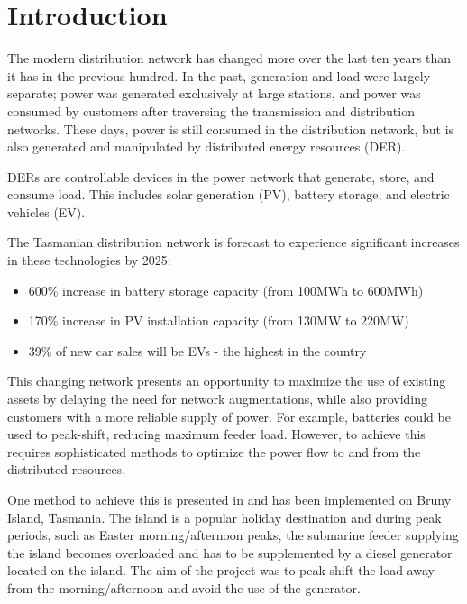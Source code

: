 \documentclass[conference]{IEEEtran}
\begin{document}
\section{Introduction}
The modern distribution network has changed more over the last ten years than it has in the previous hundred.
In the past, generation and load were largely separate; power was generated exclusively at large stations, and power was consumed by customers after traversing the transmission and distribution networks. 
These days, power is still consumed in the distribution network, but is also generated and manipulated by distributed energy resources (DER). 
\par
DERs are controllable devices in the power network that generate, store, and consume load. 
This includes solar generation (PV), battery storage, and electric vehicles (EV). 
\par
The Tasmanian distribution network is forecast to experience significant increases in these technologies by 2025: \\
\begin{itemize}
	\item 600\% increase in battery storage capacity (from 100MWh to 600MWh) \cite{Jacobs2017}
	\item 170\% increase in PV installation capacity (from 130MW to 220MW) \cite{Jacobs2017}
	\item 39\% of new car sales will be EVs - the highest in the country \cite{AEMO2016}
\end{itemize}

This changing network presents an opportunity to maximize the use of existing assets by delaying the need for network augmentations, while also providing customers with a more reliable supply of power.
For example, batteries could be used to peak-shift, reducing maximum feeder load.
However, to achieve this requires sophisticated methods to optimize the power flow to and from the distributed resources.
\par
One method to achieve this is presented in \cite{Scott2014} and has been implemented on Bruny Island, Tasmania.
The island is a popular holiday destination and during peak periods, such as Easter morning/afternoon peaks, the submarine feeder supplying the island becomes overloaded and has to be supplemented by a diesel generator located on the island.
The aim of the project was to peak shift the load away from the morning/afternoon and avoid the use of the generator.
\end{document}
